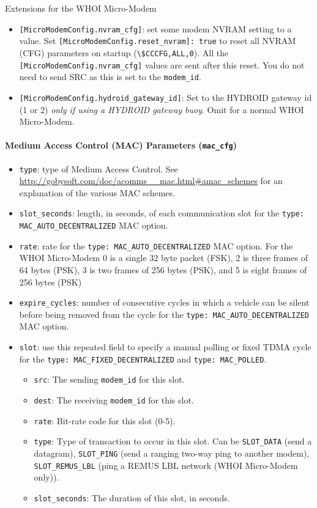 \documentclass[11pt, letterpaper, oneside]{memoir}
\begin{document}
Extensions for the WHOI Micro-Modem
\begin{itemize}
\item \verb|[MicroModemConfig.nvram_cfg]|: set some modem NVRAM setting to a value. Set \verb|[MicroModemConfig.reset_nvram]: true| to reset all NVRAM (CFG) parameters on startup (\verb|\$CCCFG,ALL,0|). All the \verb|[MicroModemConfig.nvram_cfg]| values are sent after this reset. You do not need to send SRC as this is set to the \verb|modem_id|.
\item  \verb|[MicroModemConfig.hydroid_gateway_id]|: Set to the HYDROID gateway id (1 or 2) \textit{only if using a HYDROID gateway buoy}. Omit for a normal WHOI Micro-Modem.
\end{itemize} 

\paragraph{Medium Access Control (MAC) Parameters (\texttt{mac\_cfg})}
\begin{itemize}
\item \verb|type|: type of Medium Access Control. See \url{http://gobysoft.com/doc/acomms__mac.html#amac_schemes} for an explanation of the various MAC schemes.
\item \verb|slot_seconds|: length, in seconds, of each communication slot for the \verb|type: MAC_AUTO_DECENTRALIZED| MAC option.
\item \verb|rate|: rate for the \verb|type: MAC_AUTO_DECENTRALIZED| MAC option. For the WHOI Micro-Modem 0 is a single 32 byte packet (FSK), 2 is three frames of 64 bytes (PSK), 3 is two frames of 256 bytes (PSK), and 5 is eight frames of 256 bytes (PSK)
\item \verb|expire_cycles|: number of consecutive cycles in which a vehicle can be silent before being removed from the cycle for the \verb|type: MAC_AUTO_DECENTRALIZED| MAC option.
\item \verb|slot|: use this repeated field to specify a manual polling or fixed TDMA cycle for the  \verb|type: MAC_FIXED_DECENTRALIZED| and  \verb|type: MAC_POLLED|. 
\begin{itemize}
\item \verb|src|: The sending \verb|modem_id| for this slot.
\item \verb|dest|: The receiving \verb|modem_id| for this slot.
\item \verb|rate|: Bit-rate code for this slot (0-5).
\item \verb|type|: Type of transaction to occur in this slot. Can be \verb|SLOT_DATA| (send a datagram), \verb|SLOT_PING| (send a ranging two-way ping to another modem), \verb|SLOT_REMUS_LBL| (ping a REMUS LBL network (WHOI Micro-Modem only)).
\item \verb|slot_seconds|: The duration of this slot, in seconds.
\end{itemize} 
\end{itemize} 
\end{document}
